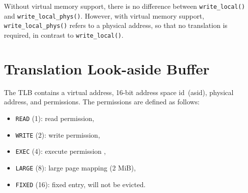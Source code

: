 Without virtual memory support, there is no difference between \texttt{write\_local()} and
\texttt{write\_local\_phys()}. However, with virtual memory support, \texttt{write\_local\_phys()}
refers to a physical address, so that no translation is required, in contrast to
\texttt{write\_local()}.

\section{Translation Look-aside Buffer}
\label{sec:tlb}

The TLB contains a virtual address, 16-bit address space id~(asid), physical address, and
permissions. The permissions are defined as follows:

\begin{itemize}
  \item \texttt{READ} (1): read permission,
  \item \texttt{WRITE} (2): write permission,
  \item \texttt{EXEC} (4): execute permission ,
  \item \texttt{LARGE} (8): large page mapping (2 MiB),
  \item \texttt{FIXED} (16): fixed entry, will not be evicted.
\end{itemize}
\extend{}
